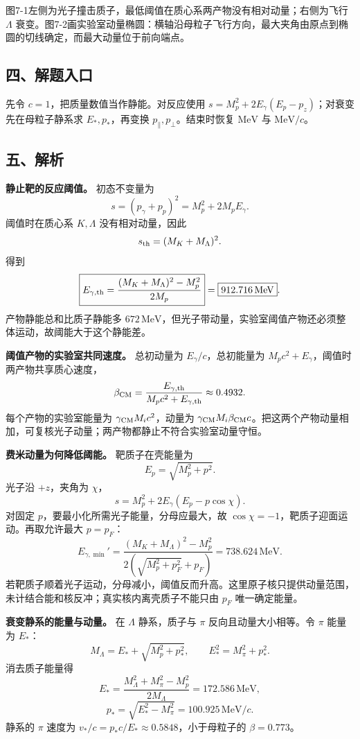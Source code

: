 \documentclass[12pt,a4paper,UTF8]{ctexart}
\begin{document}
图7-1左侧为光子撞击质子，最低阈值在质心系两产物没有相对动量；右侧为飞行
\(\Lambda\)
衰变。图7-2画实验室动量椭圆：横轴沿母粒子飞行方向，最大夹角由原点到椭圆的切线确定，而最大动量位于前向端点。

\subsection{四、解题入口}\label{ux56dbux89e3ux9898ux5165ux53e3-6}

先令 \(c=1\)，把质量数值当作静能。对反应使用
\(s=M_p^2+2E_\gamma(E_p-p_z)\)；对衰变先在母粒子静系求
\(E_*,p_*\)，再变换 \(p_\parallel,p_\perp\)。结束时恢复 \(\mathrm{MeV}\)
与 \(\mathrm{MeV}/c\)。

\subsection{五、解析}\label{ux4e94ux89e3ux6790-6}

\textbf{静止靶的反应阈值。} 初态不变量为 \[
s=(p_\gamma+p_p)^2=M_p^2+2M_pE_\gamma.
\] 阈值时在质心系 \(K,\Lambda\) 没有相对动量，因此 \[
s_{\rm th}=(M_K+M_\Lambda)^2.
\] 得到 \[
\boxed{E_{\gamma,\rm th}
=\frac{(M_K+M_\Lambda)^2-M_p^2}{2M_p}}
=\boxed{912.716\,\mathrm{MeV}}.
\] 产物静能总和比质子静能多
\(672\,\mathrm{MeV}\)，但光子带动量，实验室阈值产物还必须整体运动，故阈能大于这个静能差。

\textbf{阈值产物的实验室共同速度。} 总初动量为
\(E_\gamma/c\)，总初能量为
\(M_pc^2+E_\gamma\)，阈值时两产物共享质心速度， \[
\beta_{\rm CM}=
\frac{E_{\gamma,\rm th}}{M_pc^2+E_{\gamma,\rm th}}
\approx0.4932.
\] 每个产物的实验室能量为 \(\gamma_{\rm CM}M_ic^2\)，动量为
\(\gamma_{\rm CM}M_i\beta_{\rm CM}c\)。把这两个产物动量相加，可复核光子动量；两产物都静止不符合实验室动量守恒。

\textbf{费米动量为何降低阈能。} 靶质子在壳能量为 \[
E_p=\sqrt{M_p^2+p^2}.
\] 光子沿 \(+z\)，夹角为 \(\chi\)， \[
s=M_p^2+2E_\gamma(E_p-p\cos\chi).
\] 对固定 \(p\)，要最小化所需光子能量，分母应最大，故
\(\cos\chi=-1\)，靶质子迎面运动。再取允许最大 \(p=p_F\)： \[
\boxed{E_{\gamma,\min}'=
\frac{(M_K+M_\Lambda)^2-M_p^2}
{2(\sqrt{M_p^2+p_F^2}+p_F)}}
=\boxed{738.624\,\mathrm{MeV}}.
\]
若靶质子顺着光子运动，分母减小，阈值反而升高。这里原子核只提供动量范围，未计结合能和核反冲；真实核内离壳质子不能只由
\(p_F\) 唯一确定能量。

\textbf{衰变静系的能量与动量。} 在 \(\Lambda\) 静系，质子与 \(\pi\)
反向且动量大小相等。令 \(\pi\) 能量为 \(E_*\)： \[
M_\Lambda=E_*+\sqrt{M_p^2+p_*^2},
\qquad E_*^2=M_\pi^2+p_*^2.
\] 消去质子能量得 \[
\boxed{E_*=\frac{M_\Lambda^2+M_\pi^2-M_p^2}{2M_\Lambda}}
=172.586\,\mathrm{MeV},
\] \[
\boxed{p_*=\sqrt{E_*^2-M_\pi^2}}
=100.925\,\mathrm{MeV}/c.
\] 静系的 \(\pi\) 速度为 \(v_*/c=p_*c/E_*\approx0.5848\)，小于母粒子的
\(\beta=0.773\)。
\end{document}
